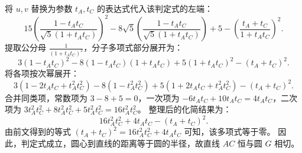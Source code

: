 \begin{solution}
将 $u, v$ 替换为参数 $t_A, t_C$ 的表达式代入该判定式的左端：
\[ 15 \left( \frac{1-t_A t_C}{\sqrt{5}(1+t_A t_C)} \right)^2 - 8\sqrt{5} \left( \frac{1-t_A t_C}{\sqrt{5}(1+t_A t_C)} \right) + 5 - \left( \frac{t_A+t_C}{1+t_A t_C} \right)^2. \]
提取公分母 $\frac{1}{(1+t_A t_C)^2}$，分子多项式部分展开为：
\[ 3(1-t_A t_C)^2 - 8(1-t_A t_C)(1+t_A t_C) + 5(1+t_A t_C)^2 - (t_A+t_C)^2. \]
将各项按次幂展开：
\[ 3(1 - 2t_A t_C + t_A^2 t_C^2) - 8(1 - t_A^2 t_C^2) + 5(1 + 2t_A t_C + t_A^2 t_C^2) - (t_A+t_C)^2. \]
合并同类项，常数项为 $3 - 8 + 5 = 0$，一次项为 $-6t_A t_C + 10t_A t_C = 4t_A t_C$，二次项为 $3t_A^2 t_C^2 + 8t_A^2 t_C^2 + 5t_A^2 t_C^2 = 16t_A^2 t_C^2$。
整理后的化简结果为：
\[ 16t_A^2 t_C^2 + 4t_A t_C - (t_A+t_C)^2. \]
由前文得到的等式 $(t_A + t_C)^2 = 16t_A^2 t_C^2 + 4t_A t_C$ 可知，该多项式等于零。
因此，判定式成立，圆心到直线的距离等于圆的半径，故直线 $AC$ 恒与圆 $G$ 相切。
\end{solution}



